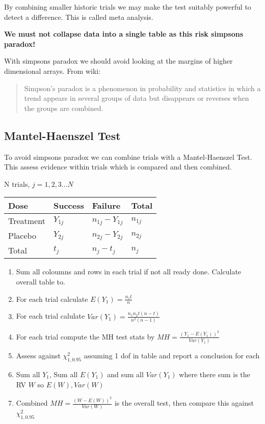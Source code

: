 \documentclass[
  letterpaper,
  DIV=11,
  numbers=noendperiod]{scrreprt}
\providecommand{\tightlist}{%
  \setlength{\itemsep}{0pt}\setlength{\parskip}{0pt}}\usepackage{longtable,booktabs,array}
\begin{document}
By combining smaller historic trials we may make the test suitably
powerful to detect a difference. This is called meta analysis.

\textbf{We must not collapse data into a single table as this risk
simpsons paradox!}

With simpsons paradox we should avoid looking at the margins of higher
dimensional arrays. From wiki:

\begin{quote}
Simpson's paradox is a phenomenon in probability and statistics in which
a trend appears in several groups of data but disappears or reverses
when the groups are combined.
\end{quote}

\hypertarget{mantel-haenszel-test}{%
\subsection{Mantel-Haenszel Test}\label{mantel-haenszel-test}}

To avoid simpsons paradox we can combine trials with a Mantel-Haenszel
Test. This assess evidence within trials which is compared and then
combined.

N trials, \(j = 1,2,3 ... N\)

\begin{longtable}[]{@{}llll@{}}
\toprule()
Dose & Success & Failure & Total \\
\midrule()
\endhead
Treatment & \(Y_{1j}\) & \(n_{1j} - Y_{1j}\) & \(n_{1j}\) \\
Placebo & \(Y_{2j}\) & \(n_{2j} - Y_{2j}\) & \(n_{2j}\) \\
Total & \(t_j\) & \(n_{j} - t_{j}\) & \(n_{j}\) \\
\bottomrule()
\end{longtable}

\begin{enumerate}
\def\labelenumi{\arabic{enumi})}
\tightlist
\item
  Sum all coloumns and rows in each trial if not all ready done.
  Calculate overall table to.
\item
  For each trial calculate \(E(Y_1) = \frac{n_1 t}{n}\)
\item
  For each trial calulate \(Var(Y_1) = \frac{n_1 n_2 t(n-t)}{n^2(n-1)}\)
\item
  For each trial compute the MH test stats by
  \(MH = \frac{(Y_1 - E(Y_1))^2}{Var(Y_1)}\)
\item
  Assess against \(\chi^2_{1,0.95}\) assuming 1 dof in table and report
  a conclusion for each
\item
  Sum all \(Y_1\), Sum all \(E(Y_1)\) and sum all \(Var(Y_1)\) where
  there sum is the RV \(W\) so \(E(W), Var(W)\)
\item
  Combined \(MH = \frac{(W - E(W))^2}{Var(W)}\) is the overall test,
  then compare this against \(\chi^2_{1,0.95}\)
\end{enumerate}
\end{document}
